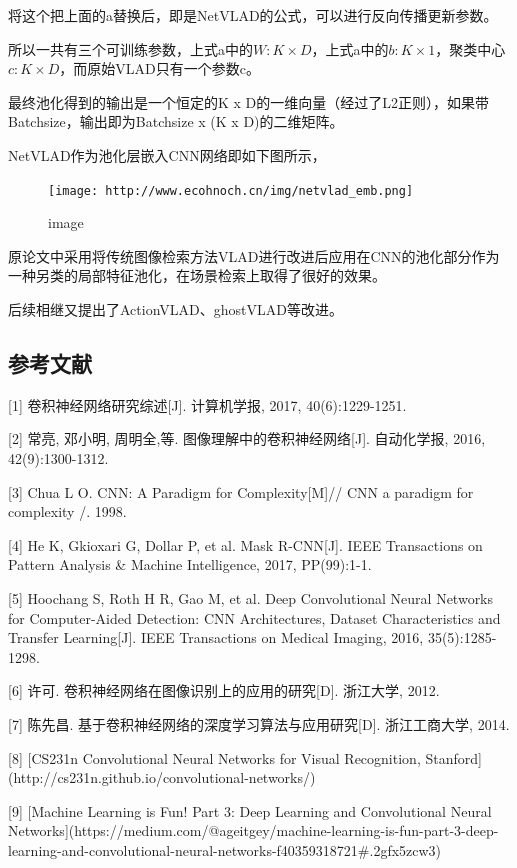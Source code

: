 将这个把上面的a替换后，即是NetVLAD的公式，可以进行反向传播更新参数。

所以一共有三个可训练参数，上式a中的\(W: K \times D\)，上式a中的\(b: K \times 1\)，聚类中心\(c: K \times D\)，而原始VLAD只有一个参数c。

最终池化得到的输出是一个恒定的K x
D的一维向量（经过了L2正则），如果带Batchsize，输出即为Batchsize x (K x
D)的二维矩阵。

NetVLAD作为池化层嵌入CNN网络即如下图所示，

\begin{figure}
\centering
\texttt{[image: http://www.ecohnoch.cn/img/netvlad\_emb.png]}
\caption{image}
\end{figure}

原论文中采用将传统图像检索方法VLAD进行改进后应用在CNN的池化部分作为一种另类的局部特征池化，在场景检索上取得了很好的效果。

后续相继又提出了ActionVLAD、ghostVLAD等改进。

\subsection{参考文献}\label{ux53c2ux8003ux6587ux732e}

{[}1{]} 卷积神经网络研究综述{[}J{]}. 计算机学报, 2017, 40(6):1229-1251.

{[}2{]} 常亮, 邓小明, 周明全,等. 图像理解中的卷积神经网络{[}J{]}.
自动化学报, 2016, 42(9):1300-1312.

{[}3{]} Chua L O. CNN: A Paradigm for Complexity{[}M{]}// CNN a paradigm
for complexity /. 1998.

{[}4{]} He K, Gkioxari G, Dollar P, et al. Mask R-CNN{[}J{]}. IEEE
Transactions on Pattern Analysis \& Machine Intelligence, 2017,
PP(99):1-1.

{[}5{]} Hoochang S, Roth H R, Gao M, et al. Deep Convolutional Neural
Networks for Computer-Aided Detection: CNN Architectures, Dataset
Characteristics and Transfer Learning{[}J{]}. IEEE Transactions on
Medical Imaging, 2016, 35(5):1285-1298.

{[}6{]} 许可. 卷积神经网络在图像识别上的应用的研究{[}D{]}. 浙江大学,
2012.

{[}7{]} 陈先昌. 基于卷积神经网络的深度学习算法与应用研究{[}D{]}.
浙江工商大学, 2014.

{[}8{]} {[}CS231n Convolutional Neural Networks for Visual Recognition,
Stanford{]}(http://cs231n.github.io/convolutional-networks/)

{[}9{]} {[}Machine Learning is Fun! Part 3: Deep Learning and
Convolutional Neural
Networks{]}(https://medium.com/@ageitgey/machine-learning-is-fun-part-3-deep-learning-and-convolutional-neural-networks-f40359318721\#.2gfx5zcw3)

